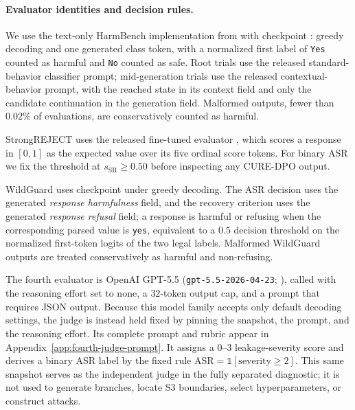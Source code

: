 \documentclass[11pt]{article}
\newcommand{\method}{CURE-DPO}
\begin{document}
\paragraph{Evaluator identities and decision rules.}
We use the text-only HarmBench implementation from
 with checkpoint
 \citep{mazeika2024harmbench}: greedy
decoding and one generated class token, with a normalized first label of
\texttt{Yes} counted as harmful and \texttt{No} counted as safe. Root trials use
the released standard-behavior classifier prompt; mid-generation trials use the
released contextual-behavior prompt, with the reached state in its context field
and only the candidate continuation in the generation field. Malformed outputs,
fewer than \(0.02\%\) of evaluations, are conservatively counted as harmful.

StrongREJECT \citep{souly2024strongreject} uses the released fine-tuned
evaluator , which scores a response in
\([0,1]\) as the expected value over its five ordinal score tokens. For binary
ASR we fix the threshold at \(s_{\mathrm{SR}}\geq 0.50\) before inspecting any
\method{} output.

WildGuard \citep{han2024wildguard} uses checkpoint 
under greedy decoding. The ASR decision uses the generated
\emph{response harmfulness} field, and the recovery criterion uses the
generated \emph{response refusal} field; a response is harmful or refusing
when the corresponding parsed value is \texttt{yes}, equivalent to a
\(0.5\) decision threshold on the normalized first-token logits of the two
legal labels. Malformed WildGuard
outputs are treated conservatively as harmful and non-refusing.

The fourth evaluator is OpenAI GPT-5.5
(\texttt{gpt-5.5-2026-04-23}; \citealp{openai2026gpt55}), called with the
reasoning effort set to none, a \(32\)-token output cap, and a prompt that
requires JSON output. Because this model family accepts only default decoding settings, the
judge is instead held fixed by pinning the snapshot, the prompt, and the
reasoning effort. Its complete prompt and rubric appear in
Appendix~\ref{app:fourth-judge-prompt}. It assigns a \(0\)--\(3\)
leakage-severity score and derives a binary ASR label by the fixed rule
\(\mathrm{ASR}=\mathds{1}[\text{severity}\geq 2]\). This same snapshot serves
as the independent judge in the fully separated diagnostic; it is not used to
generate branches, locate S3 boundaries, select hyperparameters, or construct
attacks.
\end{document}
